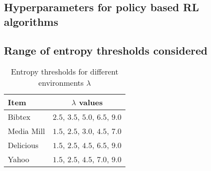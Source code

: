 \subsection{Hyperparameters for policy based RL algorithms}
\label{sec:app_hyperparams_rl}
\begin{table*}[!htbp]
    \centering
    \caption{HyperParameters for Policy based Algorithms. AFD=Advantage function discount.}
    \vspace{+2mm}
    \label{tab:hyperparams_policy_based_algo}
\end{table*}

\subsection{Range of entropy thresholds considered}
\label{subsec:entropy_range}
\begin{table}[H]
    \centering
    \caption{Entropy thresholds for different environments $\lambda$}
    \begin{tabular}{lc}
        \toprule
        \textbf{Item} & \textbf{$\lambda$ values} \\
        \midrule
        Bibtex & $2.5$, $3.5$, $5.0$, $6.5$, $9.0$ \\
        Media Mill & $1.5$, $2.5$, $3.0$, $4.5$, $7.0$ \\
        Delicious & $1.5$, $2.5$, $4.5$, $6.5$, $9.0$ \\
        Yahoo & $1.5$, $2.5$, $4.5$, $7.0$, $9.0$ \\
        \bottomrule
    \end{tabular}
    \label{tab:lambda_values}
\end{table}



%
%
%
%







